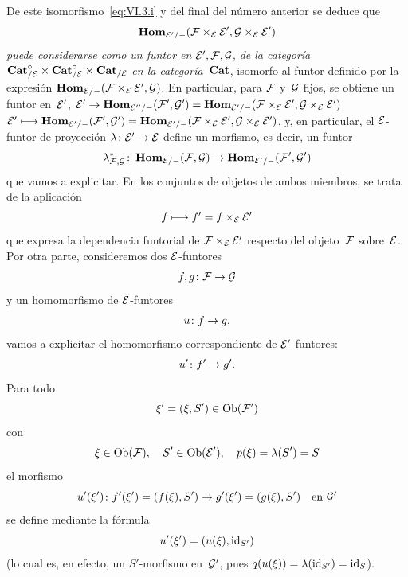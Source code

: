 De este isomorfismo~\eqref{eq:VI.3.i} y del final del número anterior se deduce
que
$$
\SheafHom_{\cal{E}'/-}(\cal{F}\times_{\cal{E}}\cal{E}',\cal{G}
\times_{\cal{E}}\cal{E}')
$$
\emph{puede considerarse como un funtor en}
$\cal{E}',\cal{F},\cal{G}$, \emph{de la categoría}
$\Cat_{/\cal{E}}^\circ\times\Cat_{/\cal{E}}^\circ\allowbreak\times\Cat_{/\cal{E}}$
\emph{en la categoría}~$\Cat$, isomorfo al funtor definido por la expresión
$\SheafHom_{\cal{E}/-}(\cal{F}\times_{\cal{E}}\cal{E}',\cal{G})$. En
particular, para $\cal{F}$ y~$\cal{G}$ fijos, se obtiene un funtor en~$\cal{E}'$,
{$\cal{E}'\to\SheafHom_{\cal{E}''/-}(\cal{F}',\cal{G}')=
\SheafHom_{\cal{E}'/-}(\cal{F}\times_{\cal{E}}
\cal{E}',\cal{G}\times_{\cal{E}}\cal{E}')$}
{$\cal{E}'\mto\SheafHom_{\cal{E}'/-}(\cal{F}',\cal{G}')=
\SheafHom_{\cal{E}'/-}(\cal{F}\times_{\cal{E}}
\cal{E}',\cal{G}\times_{\cal{E}}\cal{E}')$}, y, en particular, el
$\cal{E}$-funtor de proyección $\lambda\colon\cal{E}'\to\cal{E}$ define un
morfismo, es decir, un funtor
$$
\lambda^*_{\cal{F},\cal{G}}\colon
\SheafHom_{\cal{E}/-}(\cal{F},\cal{G})\to
\SheafHom_{\cal{E}'/-}(\cal{F}',\cal{G}')
$$
que vamos a explicitar. En los conjuntos de objetos de ambos miembros, se trata
de la aplicación
$$
f\mto f'=f\times_{\cal{E}}\cal{E}'
$$
que expresa la dependencia funtorial de
$\cal{F}\times_{\cal{E}}\cal{E}'$ respecto del objeto~$\cal{F}$
sobre~$\cal{E}$. Por otra parte, consideremos dos $\cal{E}$-funtores
$$
f,g\colon\cal{F}\to\cal{G}
$$
y un homomorfismo de $\cal{E}$-funtores
$$
u\colon f\to g\quoi,
$$
vamos
a explicitar el homomorfismo correspondiente de $\cal{E}'$-funtores:
$$
u'\colon f'\to g'\quoi.
$$
Para todo
$$
\xi'=(\xi,S')\in\Ob(\cal{F}')
$$
con
$$
\xi\in\Ob(\cal{F}),\quad S'\in\Ob(\cal{E}'),\quad p(\xi)=\lambda(S')=S
$$
el morfismo
$$
u'(\xi')\colon f'(\xi')=(f(\xi),S')\to g'(\xi')=(g(\xi),S')\quad
\text{en }\cal{G}'
$$
se define mediante la fórmula
$$
u'(\xi')=(u(\xi),\id_{S'})
$$
(lo cual es, en efecto, un $S'$-morfismo en~$\cal{G}'$, pues
$q(u(\xi))=\lambda(\id_{S'})=\id_S$).

